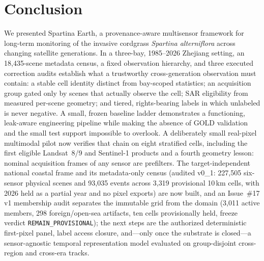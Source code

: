 \section{Conclusion}\label{sec:conclusion}

We presented Spartina Earth, a provenance-aware multisensor framework
for long-term monitoring of the invasive cordgrass \emph{Spartina
alterniflora} across changing satellite generations. In a three-bay,
1985--2026 Zhejiang setting, an 18{,}435-scene metadata census, a
fixed observation hierarchy, and three executed correction audits
establish what a trustworthy cross-generation observation must
contain: a stable cell identity distinct from bay-scoped statistics;
an acquisition group gated only by scenes that actually observe the
cell; SAR eligibility from measured per-scene geometry; and tiered,
rights-bearing labels in which unlabeled is never negative. A small,
frozen baseline ladder demonstrates a functioning, leak-aware
engineering pipeline while making the absence of GOLD validation and
the small test support impossible to overlook. A deliberately small real-pixel multimodal pilot now verifies that
chain on eight stratified cells, including the first eligible
Landsat~8/9 and Sentinel-1 products and a fourth geometry lesson:
nominal acquisition frames of any sensor are prefilters. The target-independent national coastal frame and its metadata-only
census (audited v0\_1: 227{,}505 six-sensor physical scenes and
93{,}035 events across 3{,}319 provisional 10\,km cells, with 2026
held as a partial year and no pixel exports) are now built, and an
Issue~\#17 v1 membership audit separates the immutable grid from the
domain (3{,}011 active members, 298 foreign/open-sea artifacts, ten
cells provisionally held, freeze verdict \texttt{REMAIN\_PROVISIONAL});
the next steps are the
authorized deterministic first-pixel panel, label access closure,
and---only once the substrate is closed---a sensor-agnostic temporal
representation model evaluated on group-disjoint cross-region and
cross-era tracks.
